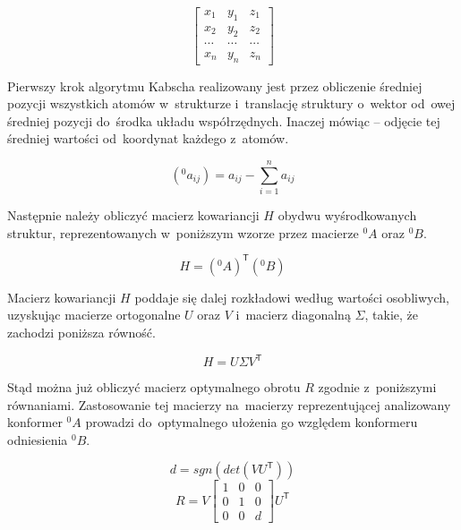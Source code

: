 \begin{equation}
  \begin{bmatrix}
    x_1 & y_1 & z_1\\
    x_2 & y_2 & z_2\\
    \cdots & \cdots & \cdots \\
    x_n & y_n & z_n
  \end{bmatrix}
\end{equation}

Pierwszy krok algorytmu Kabscha realizowany jest przez obliczenie średniej pozycji
  wszystkich atomów w~strukturze i~translację struktury o~wektor od~owej średniej pozycji
  do~środka układu współrzędnych.
Inaczej mówiąc \--- odjęcie tej średniej wartości od~koordynat każdego z~atomów.

\begin{equation}
  (^0a_{ij}) = a_{ij} - \sum\limits^n_{i=1}a_{ij}
\end{equation}

Następnie należy obliczyć macierz kowariancji $H$ obydwu wyśrodkowanych struktur,
  reprezentowanych w~poniższym wzorze przez macierze $^0\!A$ oraz $^0B$.

\begin{equation}
  H = (^0\!A)^\mathsf{T}(^0B)
\end{equation}

Macierz kowariancji $H$ poddaje się dalej rozkładowi według wartości osobliwych, uzyskując
  macierze ortogonalne $U$ oraz $V$ i~macierz diagonalną $\varSigma$, takie, że zachodzi
  poniższa równość.

\begin{equation}
  H = U\varSigma{}V^\mathsf{T}
\end{equation}

Stąd można już obliczyć macierz optymalnego obrotu $R$ zgodnie z~poniższymi równaniami.
Zastosowanie tej macierzy na~macierzy reprezentującej analizowany konformer $^0\!A$ prowadzi
  do~optymalnego ułożenia go względem konformeru odniesienia $^0B$.

\begin{equation}
  d = sgn(det(VU^\mathsf{T}))
\end{equation}
\begin{equation}
  R = V \begin{bmatrix}
    1 & 0 & 0 \\
    0 & 1 & 0 \\
    0 & 0 & d
  \end{bmatrix} U^\mathsf{T}
\end{equation}

